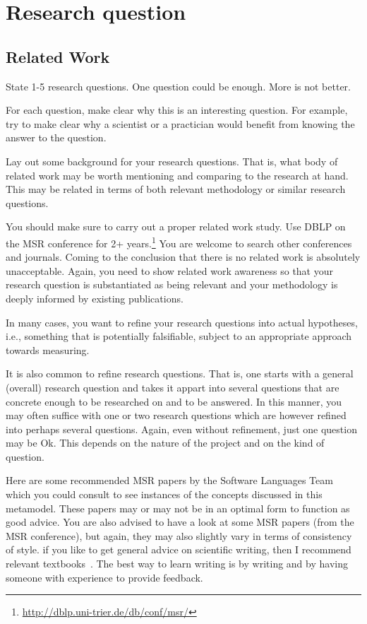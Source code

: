 \section{Research question}
\label{sec:research-question}

\subsection{Related Work}
\label{sec:related-work}

State 1-5 research questions. One question could be enough. More is
not better.

For each question, make clear why this is an interesting question. For
example, try to make clear why a scientist or a practician would
benefit from knowing the answer to the question.

Lay out some background for your research questions. That is, what
body of related work may be worth mentioning and comparing to the
research at hand. This may be related in terms of both relevant
methodology or similar research questions.

You should make sure to carry out a proper related work study. Use
DBLP on the MSR conference for 2+
years.\footnote{\url{http://dblp.uni-trier.de/db/conf/msr/}} You are
welcome to search other conferences and journals. Coming to the
conclusion that there is no related work is absolutely
unacceptable. Again, you need to show related work awareness so that
your research question is substantiated as being relevant and
your methodology is deeply informed by existing publications.

In many cases, you want to refine your research questions into actual
hypotheses, i.e., something that is potentially falsifiable, subject
to an appropriate approach towards measuring.

It is also common to refine research questions. That is, one starts
with a general (overall) research question and takes it appart into
several questions that are concrete enough to be researched on and to
be answered. In this manner, you may often suffice with one or two
research questions which are however refined into perhaps
several questions. Again, even without refinement, just one question may be
Ok. This depends on the nature of the project and on the kind of question.

Here are some recommended MSR papers by the Software Languages
Team~\cite{LaemmelLPV11,LaemmelP13,SchmorleizL15} which you could
consult to see instances of the concepts discussed in this
metamodel. These papers may or may not be in an optimal form to
function as good advice. You are also advised to have a look at some
MSR papers (from the MSR conference), but again, they may also
slightly vary in terms of consistency of style. if you like to get
general advice on scientific writing, then I recommend relevant
textbooks~\cite{Day98,Zobel09}. The best way to learn writing is by
writing and by having someone with experience to provide feedback.

